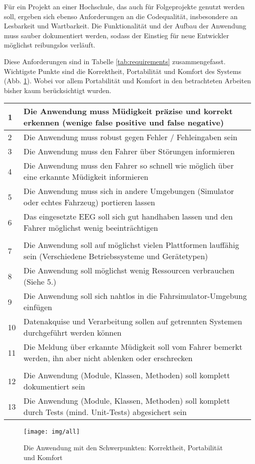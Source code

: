 Für ein Projekt an einer Hochschule, das auch für Folgeprojekte genutzt werden soll, ergeben sich ebenso Anforderungen an die Codequalität, insbesondere an Lesbarkeit und Wartbarkeit. Die Funktionalität und der Aufbau der Anwendung muss sauber dokumentiert werden, sodass der Einstieg für neue Entwickler möglichst reibungslos verläuft.

Diese Anforderungen sind in Tabelle \ref{tab:requirements} zusammengefasst. Wichtigste Punkte sind die Korrektheit, Portabilität und Komfort des Systems (Abb. \ref{fig:emphasis}). Wobei vor allem Portabilität und Komfort in den betrachteten Arbeiten bisher kaum berücksichtigt wurden.

\begin{table*}[t]
 \caption{Anforderungen}
 \renewcommand{\arraystretch}{2}
 \begin{tabularx}{\textwidth}{lX}
  1 & Die Anwendung muss Müdigkeit präzise und korrekt erkennen (wenige false positive und false negative) \\ \hline
  2 & Die Anwendung muss robust gegen Fehler / Fehleingaben sein \\ \hline 
  3 & Die Anwendung muss den Fahrer über Störungen informieren \\ \hline
  4 & Die Anwendung muss den Fahrer so schnell wie möglich über eine erkannte Müdigkeit informieren \\ \hline
  5 & Die Anwendung muss sich in andere Umgebungen (Simulator oder echtes Fahrzeug) portieren lassen \\ \hline 
  6 & Das eingesetzte EEG soll sich gut handhaben lassen und den Fahrer möglichst wenig beeinträchtigen \\ \hline
  \\
  7 & Die Anwendung soll auf möglichst vielen Plattformen lauffähig sein (Verschiedene Betriebssysteme und Gerätetypen) \\ \hline
  8 & Die Anwendung soll möglichst wenig Ressourcen verbrauchen (Siehe 5.) \\ \hline
  9 & Die Anwendung soll sich nahtlos in die Fahrsimulator-Umgebung einfügen \\ \hline
  10 & Datenakquise und Verarbeitung sollen auf getrennten Systemen durchgeführt werden können \\ \hline
  11 & Die Meldung über erkannte Müdigkeit soll vom Fahrer bemerkt werden, ihn aber nicht ablenken oder erschrecken \\ \hline
  \\
  12 & Die Anwendung (Module, Klassen, Methoden) soll komplett dokumentiert sein \\ \hline 
  13 & Die Anwendung (Module, Klassen, Methoden) soll komplett durch Tests (mind. Unit-Tests) abgesichert sein \\ \hline
 \end{tabularx}
 \label{tab:requirements}
\end{table*}

\begin{figure}[h] 
  \begin{center}
    \texttt{[image: img/all]}
    \caption[Schwerpunkte der Anwendung]{Die Anwendung mit den Schwerpunkten: Korrektheit, Portabilität und Komfort \label{fig:emphasis}}
  \end{center}
\end{figure}